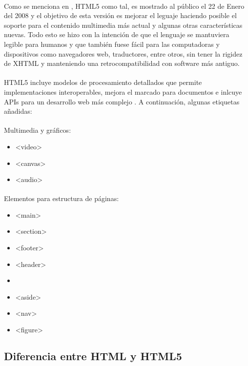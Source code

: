 \documentclass{article}
\begin{document}
\paragraph{}
Como se menciona en \cite{wiki_html5}, HTML5 como tal, es mostrado al público el
22 de Enero del 2008 y el objetivo de esta versión es mejorar el leguaje haciendo
posible el soporte para el contenido multimedia más actual y algunas otras
características nuevas. Todo esto se hizo con la intención de que el lenguaje
se mantuviera legible para humanos y que también fuese fácil para las computadoras
y dispositivos como navegadores web, traductores, entre otros, sin tener
la rigidez de XHTML y manteniendo una retrocompatibilidad con software más
antiguo.

\paragraph{}
HTML5 incluye modelos de procesamiento detallados que permite implementaciones
interoperables, mejora el marcado para documentos e inlcuye APIs para un desarrollo
web más complejo \cite{wiki_html5}. A continuación, algunas etiquetas añadidas:

\paragraph{}
Multimedia y gráficos:
\begin{itemize}
	\item <video>
	\item <canvas>
	\item <audio>
\end{itemize}

\paragraph{}
Elementos para estructura de páginas:
\begin{itemize}
	\item <main>
	\item <section>
	\item <footer>
	\item <header>
	\item <article>
	\item <aside>
	\item <nav>
	\item <figure>
\end{itemize}

\subsection{Diferencia entre HTML y HTML5}
\end{document}
